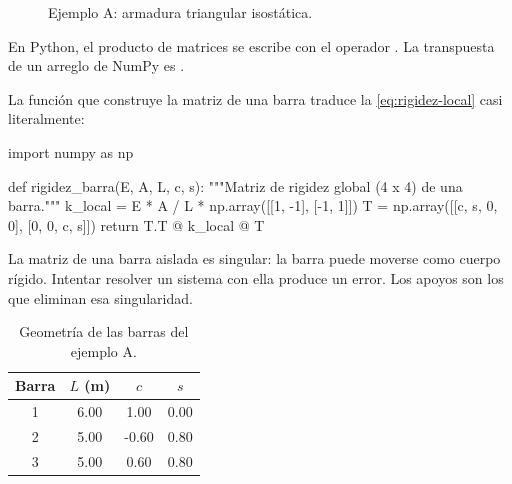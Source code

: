 \documentclass[
  fontsize=10.5pt,
  twoside=true,
  headings=standardclasses,
  numbers=noenddot,
]{scrbook}
\begin{document}
\begin{figure}[ht]
  \centering
  \caption{Ejemplo A: armadura triangular isostática.}
  \label{fig:ejemplo-a}
\end{figure}

\begin{python}
En Python, el producto de matrices se escribe con el operador .
La transpuesta de un arreglo  de NumPy es .
\end{python}

La función que construye la matriz de una barra traduce la
\cref{eq:rigidez-local} casi literalmente:

\begin{codigo}
import numpy as np

def rigidez_barra(E, A, L, c, s):
    """Matriz de rigidez global (4 x 4) de una barra."""
    k_local = E * A / L * np.array([[1, -1], [-1, 1]])
    T = np.array([[c, s, 0, 0], [0, 0, c, s]])
    return T.T @ k_local @ T
\end{codigo}

\begin{cuidado}
La matriz de una barra aislada es singular: la barra puede moverse como cuerpo
rígido. Intentar resolver un sistema con ella produce un error. Los apoyos son
los que eliminan esa singularidad.
\end{cuidado}

\begin{table}[ht]
  \centering
  \caption{Geometría de las barras del ejemplo A.}
  \begin{tabular}{@{}c S[table-format=1.2] S[table-format=-1.2] S[table-format=-1.2]@{}}
    \toprule
    {Barra} & {$L$ (\si{\metre})} & {$c$} & {$s$} \\
     & 6.00 & 1.00 & 0.00 \\
    2 & 5.00 & -0.60 & 0.80 \\
    3 & 5.00 & 0.60 & 0.80 \\
    \bottomrule
  \end{tabular}
\end{table}
\end{document}
